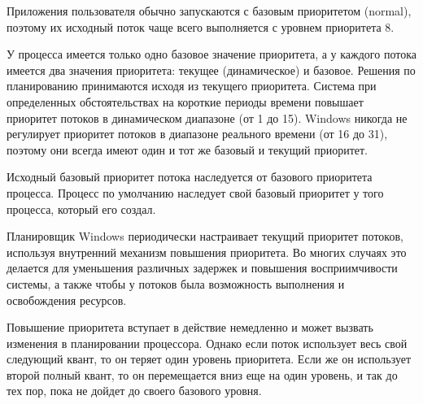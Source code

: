 \documentclass[a4paper,oneside,14pt]{extarticle}
\begin{document}
Приложения пользователя обычно запускаются с базовым приоритетом (normal), поэтому их исходный поток чаще всего выполняется с уровнем приоритета 8. 

У процесса имеется только одно базовое значение приоритета, а у каждого потока имеется два значения приоритета: текущее (динамическое) и базовое.
Решения по планированию принимаются исходя из текущего приоритета.
Система при определенных обстоятельствах на короткие периоды времени повышает приоритет потоков в динамическом диапазоне (от 1 до 15).
Windows никогда не регулирует приоритет потоков в диапазоне реального времени (от 16 до 31), поэтому они всегда имеют один и тот же базовый и текущий приоритет.

Исходный базовый приоритет потока наследуется от базового приоритета процесса.
Процесс по умолчанию наследует свой базовый приоритет у того процесса, который его создал.

Планировщик Windows периодически настраивает текущий приоритет потоков, используя внутренний механизм повышения приоритета.
Во многих случаях это делается для уменьшения различных задержек и повышения восприимчивости системы, а также чтобы у потоков была возможность выполнения и освобождения ресурсов.  


Повышение приоритета вступает в действие немедленно и может  вызвать изменения в планировании процессора.
Однако если поток использует весь свой следующий квант, то он теряет один уровень приоритета.
Если же он использует второй полный квант, то он перемещается вниз еще  на один уровень, и так до тех пор, пока не дойдет до своего базового уровня. 
\end{document}
